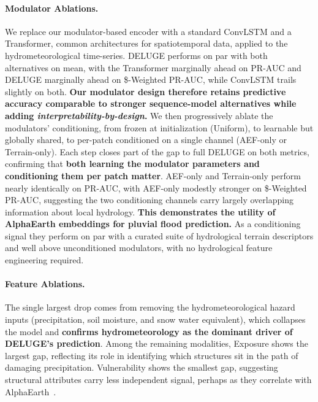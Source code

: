 \paragraph{Modulator Ablations.} We replace our modulator-based encoder with a standard ConvLSTM and a Transformer, common architectures for spatiotemporal data, applied to the hydrometeorological time-series.
%
DELUGE performs on par with both alternatives on mean, with the Transformer marginally ahead on PR-AUC and DELUGE marginally ahead on \$-Weighted PR-AUC, while ConvLSTM trails slightly on both.
%
\textbf{Our modulator design therefore retains predictive accuracy comparable to stronger sequence-model alternatives while adding \emph{interpretability-by-design}.}
%
We then progressively ablate the modulators' conditioning, from frozen at initialization (Uniform), to learnable but globally shared, to per-patch conditioned on a single channel (AEF-only or Terrain-only).
%
Each step closes part of the gap to full DELUGE on both metrics, confirming that \textbf{both learning the modulator parameters and conditioning them per patch matter}.
%
AEF-only and Terrain-only perform nearly identically on PR-AUC, with AEF-only modestly stronger on \$-Weighted PR-AUC, suggesting the two conditioning channels carry largely overlapping information about local hydrology.
%
\textbf{This demonstrates the utility of AlphaEarth embeddings for pluvial flood prediction.} As a conditioning signal they perform on par with a curated suite of hydrological terrain descriptors and well above unconditioned modulators, with no hydrological feature engineering required.

\vspace{-3pt}
\paragraph{Feature Ablations.} The single largest drop comes from removing the hydrometeorological hazard inputs (precipitation, soil moisture, and snow water equivalent), which collapses the model and \textbf{confirms hydrometeorology as the dominant driver of DELUGE's prediction}.
%
Among the remaining modalities, Exposure shows the largest gap, reflecting its role in identifying which structures sit in the path of damaging precipitation.
%
%
Vulnerability shows the smallest gap, suggesting structural attributes carry less independent signal, perhaps as they correlate with AlphaEarth~\cite{bell_earth_2026}.



